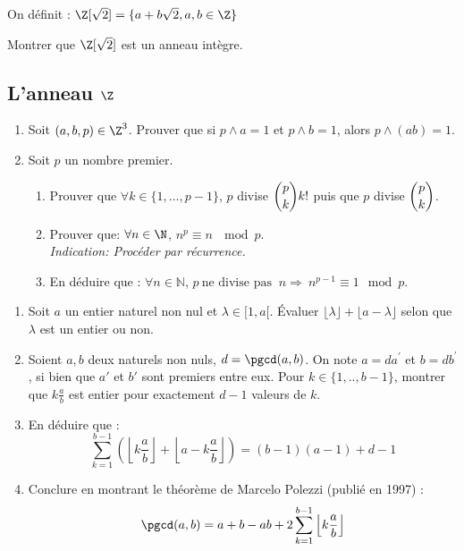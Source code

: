 \begin{exercice}
On définit :
$\Z[\sqrt{2}]=\{a+b\sqrt{2},a,b\in\Z\}$

Montrer que $\Z[\sqrt{2}]$ est un anneau intègre. 
\end{exercice}

\subsection{L'anneau \texorpdfstring{$\Z$}{Z}}

\begin{exercice}
\begin{enumerate}
    \item Soit $(a,b,p)\in \Z^3$. Prouver que si $p \wedge a = 1 $ et $p\wedge b=1$, alors $p\wedge (ab)=1$.
    \item Soit $p$ un nombre premier.
    \begin{enumerate}
        \item Prouver que $\forall k \in \{ 1,...,p-1\}$, $p$ divise $\dbinom{p}{k}k!$\:\:  puis que $p$ divise $\dbinom{p}{k}$.
        \item Prouver que:  $\forall n \in \N$,\: $n^{p}\equiv n \:\mod p $.\\
        \textit{Indication: Procéder par récurrence.}
        \item En déduire que :\: $\forall n \in{\mathbb{N}}$, $  p \:\text{ne divise pas }\: n \Longrightarrow\: n^{p-1}\equiv 1 \mod p$.
    \end{enumerate}
\end{enumerate}
\end{exercice}

\begin{exercice}
\begin{enumerate}
 \item Soit $a$ un entier naturel non nul et $\lambda\in[1,a[$. Évaluer $\lfloor \lambda \rfloor + \lfloor a -\lambda \rfloor$ selon que $\lambda$ est un entier ou non. 
 \item Soient $a, b$ deux naturels non nuls, $d=\pgcd(a,b)$. 
 On note $a=da^{\prime}$ et $b=db^{\prime}$, si bien que $a'$ et $b'$ sont premiers entre eux. 
 Pour $k\in\{1,..,b-1\}$, montrer que $k\frac{a}{b}$ est entier pour exactement $d-1$ valeurs de $k$. 
 \item En déduire que :
 \[\sum_{k=1}^{b-1}\left(\left\lfloor k\frac{a}{b}\right\rfloor+\left\lfloor a-k\frac{a}{b}\right\rfloor\right)=(b-1)(a-1)+d-1\]
 \item Conclure en montrant le théorème de Marcelo Polezzi (publié en 1997) :
 \[\pgcd(a,b)=a+b-ab+2\sum_{k=1}^{b-1}\left\lfloor k\frac{a}{b}\right\rfloor\]
\end{enumerate}
\end{exercice}

